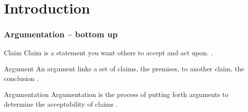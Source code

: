 \documentclass{beamer}
\begin{document}

\section{Introduction}


\begin{frame}
	\frametitle{Argumentation -- bottom up}

\begin{block}{Claim}
Claim is a statement you want others to accept and act upon.
\cite{rieke1997argumentation}. 
\end{block}

\begin{block}{Argument}
An argument links a set of claims, the premises, to another claim, the conclusion
\cite{walton1989informal}.
\end{block}

\begin{block}{Argumentation}
Argumentation is the process of putting forth arguments to determine  the
acceptability of claims \cite{walton1989informal}.
\end{block}

\end{frame}
\end{document}
